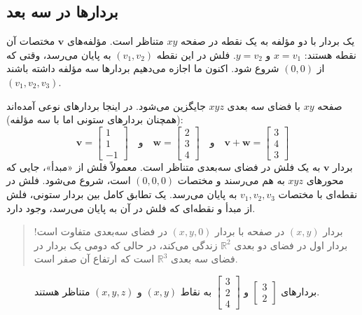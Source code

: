 \documentclass[12pt, a4paper]{book}
\begin{document}
	\subsection{بردارها در سه بعد}
	یک بردار با دو مؤلفه به یک نقطه در صفحه $xy$ متناظر است. مؤلفه‌های $\mathbf{v}$ مختصات آن نقطه هستند: $x=v_1$ و $y=v_2$. فلش در این نقطه $(v_1, v_2)$ به پایان می‌رسد، وقتی که از $(0,0)$ شروع شود. اکنون ما اجازه می‌دهیم بردارها سه مؤلفه داشته باشند $(v_1, v_2, v_3)$.
	
	صفحه $xy$ با فضای سه بعدی $xyz$ جایگزین می‌شود. در اینجا بردارهای نوعی آمده‌اند (همچنان بردارهای ستونی اما با سه مؤلفه):
	\[ \mathbf{v} = \begin{bmatrix} 1 \\ 1 \\ -1 \end{bmatrix} \quad \text{و} \quad \mathbf{w} = \begin{bmatrix} 2 \\ 3 \\ 4 \end{bmatrix} \quad \text{و} \quad \mathbf{v} + \mathbf{w} = \begin{bmatrix} 3 \\ 4 \\ 3 \end{bmatrix} \]
	بردار $\mathbf{v}$ به یک فلش در فضای سه‌بعدی متناظر است. معمولاً فلش از «مبدأ»، جایی که محورهای $xyz$ به هم می‌رسند و مختصات $(0,0,0)$ است، شروع می‌شود. فلش در نقطه‌ای با مختصات $v_1, v_2, v_3$ به پایان می‌رسد. یک تطابق کامل بین بردار ستونی، فلش از مبدأ و نقطه‌ای که فلش در آن به پایان می‌رسد، وجود دارد.
	\begin{quote}
		بردار $(x, y)$ در صفحه با بردار $(x, y, 0)$ در فضای سه‌بعدی متفاوت است! بردار اول در فضای دو بعدی $\mathbb{R}^2$ زندگی می‌کند، در حالی که دومی یک بردار در فضای سه بعدی $\mathbb{R}^3$ است که ارتفاع آن صفر است.
	\end{quote}
	
	\begin{figure}[h!]
		\centering
		\caption{بردارهای $\begin{bmatrix} 3 \\ 2 \end{bmatrix}$ و $\begin{bmatrix} 3 \\ 2 \\ 4 \end{bmatrix}$ به نقاط $(x,y)$ و $(x,y,z)$ متناظر هستند.}
	\end{figure}
	
\end{document}
